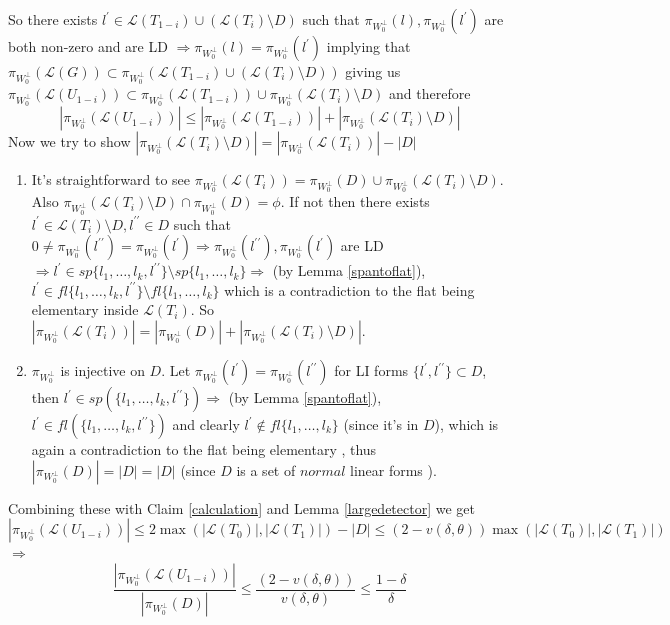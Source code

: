 \documentclass[letterpaper,USenglish,numberwithinsect]{lipics}
\newcommand{\ML}{\mathcal{L}}
\begin{document}
\begin{enumerate}
So there exists $l^\prime \in \ML(T_{1-i})\cup (\ML(T_i)\setminus D)$ such that
$\pi_{W_0^\perp}(l), \pi_{W_0^\perp}(l^\prime)$ are both non-zero and
are LD $\Rightarrow \pi_{W_0^\perp}( l)=
\pi_{W_0^\perp}( l^\prime)$
implying that $\pi_{W_0^\perp}({\ML(G)})\subset
\pi_{W_0^\perp}({\ML(T_{1-i})\cup (\ML(T_i)\setminus D)})$ giving us
$\pi_{W_0^\perp}({\ML(U_{1-i})})\subset
\pi_{W_0^\perp}({\ML(T_{1-i})}) \cup
\pi_{W_0^\perp}({\ML(T_i)\setminus D})$ and therefore
\[
|\pi_{W_0^\perp}({\ML(U_{1-i})})|\leq|\pi_{W_0^\perp}({\ML(T_{1-i})})|
+ |\pi_{W_0^\perp}({\ML(T_i)\setminus D})|
\]
Now we try to show $|\pi_{W_0^\perp}({\ML(T_i)\setminus D})| =
|\pi_{W_0^\perp}({\ML(T_i)})|-|D|$
 \begin{enumerate}
 \item It's straightforward to see $\pi_{W_0^\perp}({\ML(T_i)}) =
\pi_{W_0^\perp}( D)\cup \pi_{W_0^\perp}({\ML(T_i)\setminus D})$. Also
$\pi_{W_0^\perp}({\ML(T_i)\setminus D}) \cap
\pi_{W_0^\perp}( D)=\phi$. If not then there exists $l^\prime \in
\ML(T_i)\setminus D, l^{\prime\prime} \in D$ such that
 $0\neq \pi_{W_0^\perp}( {l^{\prime\prime}}) = \pi_{W_0^\perp}(
l^\prime)\Rightarrow  \pi_{W_0^\perp}(l^{\prime\prime}),\pi_{W_0^\perp}(l^\prime)$ are
 LD $\Rightarrow l^\prime \in sp\{l_{1},\ldots,l_{k},l^{\prime\prime}\}\setminus
sp\{l_{1},\ldots,l_{k}\} \Rightarrow$ (by Lemma \ref{spantoflat}),  $ l^\prime \in
fl\{l_{1},\ldots,l_{k},l^{\prime\prime}\}\setminus
fl\{l_{1},\ldots,l_{k}\}$ which is a contradiction to
 the flat being elementary inside $\ML(T_i)$. So $|\pi_{W_0^\perp}({\ML(T_i)})| =
|\pi_{W_0^\perp}( D)| +  |\pi_{W_0^\perp}({\ML(T_i)\setminus D})|$.
 \item $\pi_{W_0^\perp}$ is injective on $ D$. Let
$\pi_{W_0^\perp}({l^\prime})=\pi_{W_0^\perp}({l^{\prime\prime}})$ for LI forms
$\{l^\prime, l^{\prime\prime}\}\subset D$, then
 $l^\prime \in sp(\{l_1,\ldots,l_k,l^{\prime\prime}\})\Rightarrow$ (by Lemma \ref{spantoflat}), $ l^\prime \in
fl(\{l_{1},\ldots,l_{k},l^{\prime\prime}\})$ and clearly $l^\prime \notin
fl\{l_{1},\ldots,l_{k}\}$ (since it's in $D$),
 which is again a contradiction to the flat being elementary , thus
$|\pi_{W_0^\perp}( D)| = | D| = |D|$ (since $D$ is a set of $normal$ linear forms ).
 \end{enumerate}
 Combining these with Claim \ref{calculation} and Lemma \ref{largedetector} we get
 \[
 |\pi_{W_0^\perp}({\ML(U_{1-i})})|\leq 2 \max(|\ML(T_0)|, |\ML(T_1)|)-|D|\leq
(2-v(\delta,\theta))\max(|\ML(T_0)|, |\ML(T_1)|)
\]
$\Rightarrow$
\[
 \frac{|\pi_{W_0^\perp}({\ML(U_{1-i})})|}{|\pi_{W_0^\perp}( D)|}
\leq
\frac{(2-v(\delta,\theta))}{v(\delta,\theta)}\leq \frac{1-\delta}{\delta}
\]

\end{enumerate}
\end{document}
